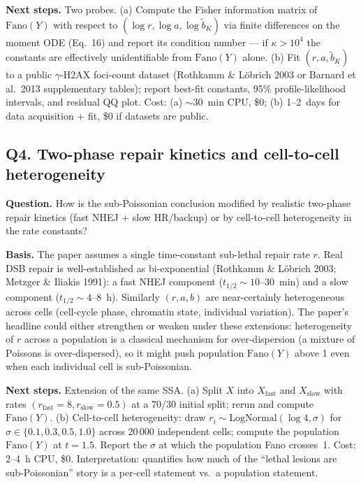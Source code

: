 \textbf{Next steps.}  Two probes.  (a) Compute the Fisher information matrix of $\mathrm{Fano}(Y)$ with respect to $(\log r,\log a,\log \tilde b_K)$ via finite differences on the moment ODE (Eq.~16) and report its condition number --- if $\kappa>10^4$ the constants are effectively unidentifiable from $\mathrm{Fano}(Y)$ alone.  (b) Fit $(r,a,\tilde b_K)$ to a public $\gamma$-H2AX foci-count dataset (Rothkamm \& L\"obrich 2003 or Barnard et al.\ 2013 supplementary tables); report best-fit constants, 95\% profile-likelihood intervals, and residual QQ plot.  Cost: (a) $\sim 30$~min CPU, \$0; (b) 1--2~days for data acquisition + fit, \$0 if datasets are public.

\subsection*{Q4.  Two-phase repair kinetics and cell-to-cell heterogeneity}

\textbf{Question.}  How is the sub-Poissonian conclusion modified by realistic two-phase repair kinetics (fast NHEJ + slow HR/backup) or by cell-to-cell heterogeneity in the rate constants?

\textbf{Basis.}  The paper assumes a single time-constant sub-lethal repair rate $r$.  Real DSB repair is well-established as bi-exponential (Rothkamm \& L\"obrich 2003; Metzger \& Iliakis 1991): a fast NHEJ component ($t_{1/2}\sim 10$--$30$~min) and a slow component ($t_{1/2}\sim 4$--$8$~h).  Similarly $(r,a,b)$ are near-certainly heterogeneous across cells (cell-cycle phase, chromatin state, individual variation).  The paper's headline could either strengthen or weaken under these extensions: heterogeneity of $r$ across a population is a classical mechanism for over-dispersion (a mixture of Poissons is over-dispersed), so it might push population $\mathrm{Fano}(Y)$ above 1 even when each individual cell is sub-Poissonian.

\textbf{Next steps.}  Extension of the same SSA.  (a) Split $X$ into $X_\mathrm{fast}$ and $X_\mathrm{slow}$ with rates $(r_\mathrm{fast}=8, r_\mathrm{slow}=0.5)$ at a 70/30 initial split; rerun and compute $\mathrm{Fano}(Y)$.  (b) Cell-to-cell heterogeneity: draw $r_i\sim\mathrm{LogNormal}(\log 4,\sigma)$ for $\sigma\in\{0.1,0.3,0.5,1.0\}$ across 20\,000 independent cells; compute the population $\mathrm{Fano}(Y)$ at $t=1.5$.  Report the $\sigma$ at which the population Fano crosses~1.  Cost: 2--4~h CPU, \$0.  Interpretation: quantifies how much of the ``lethal lesions are sub-Poissonian'' story is a per-cell statement vs.\ a population statement.

